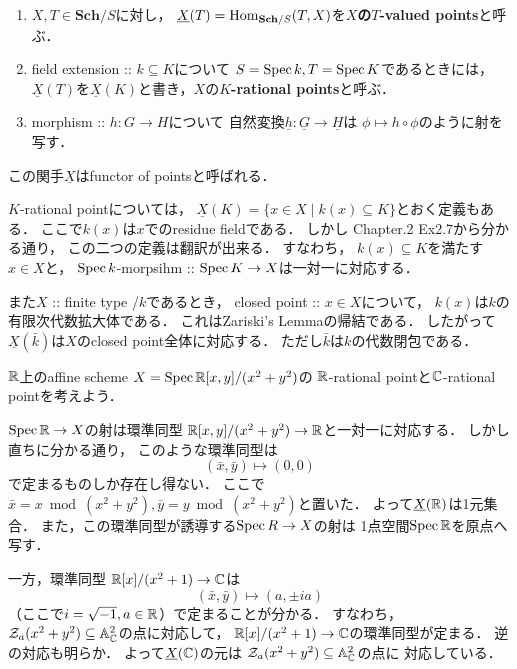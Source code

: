 \documentclass[a4paper]{jsarticle}
\newcommand{\Sch}{\mathbf{Sch}}
\newcommand{\func}[1]{\underline{#1}}
\begin{document}
    \begin{Def}
    \enumfix
    \begin{enumerate}[label=(\roman*),leftmargin=*]
    \item 
    $X, T \in \Sch/S$に対し，
    $\func{X}(T)=\Hom_{\Sch/S}(T,X)$を\textbf{$X$の$T$-valued points}と呼ぶ．

    \item
    field extension :: $k \subseteq K$について
    $S=\operatorname{Spec} k, T=\operatorname{Spec} K$であるときには，
    $\func{X}(T)$を$\func{X}(K)$と書き，$X$の\textbf{$K$-rational points}と呼ぶ．

    \item
    morphism :: $h: G \to H$について
    自然変換$\func{h}: \func{G} \to \func{H}$は
    $\phi \mapsto h \circ \phi$のように射を写す．
    \end{enumerate}
    \end{Def}
    この関手$\func{X}$はfunctor of pointsと呼ばれる．

    $K$-rational pointについては，
    $\func{X}(K)=\{ x \in X \mid k(x) \subseteq K \}$とおく定義もある．
    ここで$k(x)$は$x$でのresidue fieldである．
    しかし\cite{HarAG} Chapter.2 Ex2.7から分かる通り，
    この二つの定義は翻訳が出来る．
    すなわち，
    $k(x) \subseteq K$を満たす$x \in X$と，
    $\operatorname{Spec} k$-morpsihm :: $\operatorname{Spec} K \to X$は一対一に対応する．

    また$X$ :: finite type /$k$であるとき，
    closed point :: $x \in X$について，
    $k(x)$は$k$の有限次代数拡大体である．
    これはZariski's Lemmaの帰結である．
    したがって$\func{X}(\bar{k})$は$X$のclosed point全体に対応する．
    ただし$\bar{k}$は$k$の代数閉包である．

    \begin{Example}
        $\mathbb{R}$上のaffine scheme $X=\operatorname{Spec} \mathbb{R}[x,y]/(x^2+y^2)$の
        $\mathbb{R}$-rational pointと$\mathbb{C}$-rational pointを考えよう．

        $\operatorname{Spec} \mathbb{R} \to X$の射は環準同型 $\mathbb{R}[x,y]/(x^2+y^2) \to \mathbb{R}$と一対一に対応する．
        しかし直ちに分かる通り，
        このような環準同型は
        \[ (\bar{x}, \bar{y}) \mapsto (0, 0) \]
        で定まるものしか存在し得ない．
        ここで$\bar{x}=x \bmod (x^2+y^2), \bar{y}=y \bmod (x^2+y^2)$と置いた．
        よって$\func{X}(\R)$は1元集合．
        また，この環準同型が誘導する$\operatorname{Spec} R \to X$の射は
        1点空間$\operatorname{Spec} \mathbb{R}$を原点へ写す．

        一方，環準同型 $\mathbb{R}[x]/(x^2+1) \to \mathbb{C}$は
        \[ (\bar{x}, \bar{y}) \mapsto (a, \pm ia) \]
        （ここで$i=\sqrt{-1}, a \in \mathbb{R}$）で定まることが分かる．
        すなわち，$\mathcal{Z}_a(x^2+y^2) \subseteq \mathbb{A}^2_{\mathbb{C}}$の点に対応して，
        $\mathbb{R}[x]/(x^2+1) \to \mathbb{C}$の環準同型が定まる．
        逆の対応も明らか．
        よって$\func{X}(\C)$の元は
        $\mathcal{Z}_a(x^2+y^2) \subseteq \mathbb{A}^2_{\mathbb{C}}$の点に
        対応している．
    \end{Example}
\end{document}
